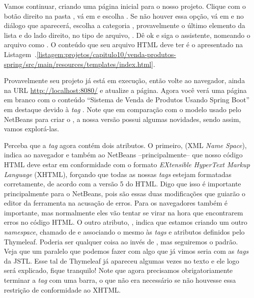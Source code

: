 Vamos continuar, criando uma página inicial para o nosso projeto. Clique com o botão direito na pasta , vá em  e escolha . Se não houver essa opção, vá em  e no diálogo que aparecerá, escolha a categoria , provavelmente o último elemento da lista e do lado direito, no tipo de arquivo, . Dê ok e siga o assistente, nomeando o arquivo como . O conteúdo que seu arquivo HTML deve ter é o apresentado na Listagem~\thechapter.\ref{listagem:projetos/capitulo10/venda-produtos-spring/src/main/resources/templates/index.html}.


Provavelmente seu projeto já está em execução, então volte ao navegador, ainda na URL \url{http://localhost:8080/} e atualize a página. Agora você verá uma página em branco com o conteúdo ``Sistema de Venda de Produtos Usando Spring Boot'' em destaque devido à \textit{tag} . Note que em comparação com o modelo usado pelo NetBeans para criar o , a nossa versão possui algumas novidades, sendo assim, vamos explorá-las.

Perceba que a \textit{tag}  agora contém dois atributos. O primeiro,  (XML \textit{Name Space}), indica ao navegador e também ao NetBeans --principalmente-- que nosso código HTML deve estar em conformidade com o formato \textit{EXtensible HyperText Markup Language} (XHTML), forçando que todas as nossas \textit{tags} estejam formatadas corretamente, de acordo com a versão 5 do HTML. Digo que isso é importante principalmente para o NetBeans, pois são essas duas modificações que guiarão o editor da ferramenta na acusação de erros. Para os navegadores também é importante, mas normalmente eles vão tentar se virar na hora que encontrarem erros no código HTML. O outro atributo, , indica que estamos criando um outro \textit{namespace}, chamado de  e associando o mesmo às \textit{tags} e atributos definidos pelo Thymeleaf. Poderia ser qualquer coisa ao invés de , mas seguiremos o padrão. Veja que um paralelo que podemos fazer com algo que já vimos seria com as \textit{tags} da JSTL. Esse tal de Thymeleaf já apareceu algumas vezes no texto e ele logo será explicado, fique tranquilo! Note que agora precisamos obrigatoriamente terminar a \textit{tag}  com uma barra, o que não era necessário se não houvesse essa restrição de conformidade ao XHTML.

